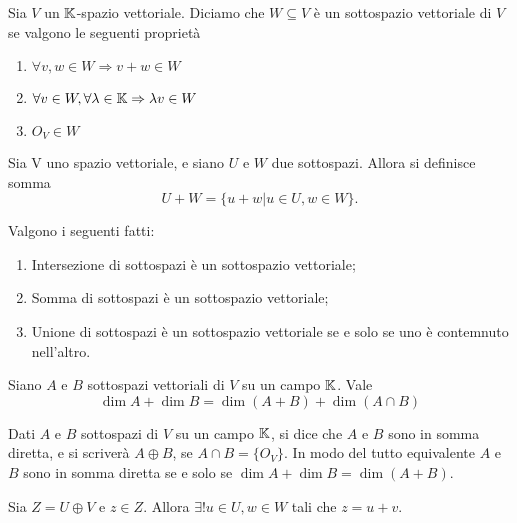 \begin{definition}
       Sia $ V $ un $ \mathbb{K} $-spazio vettoriale. Diciamo che $ W \subseteq V $ è un sottospazio vettoriale di $ V $ se valgono le seguenti proprietà
       \begin{enumerate}[label=(\roman*)]
               \item $ \forall v, w \in W \Rightarrow v + w \in W $
               \item $ \forall v \in W, \forall \lambda \in \mathbb{K} \Rightarrow \lambda v \in W $
               \item $ O_V \in W $
       \end{enumerate}
\end{definition}

\begin{definition}
	Sia V uno spazio vettoriale, e siano $U$ e $W$ due sottospazi. Allora si definisce somma
	\[ U+W = \{ u + w | u \in U, w \in W \}. \]

\begin{prop}
	Valgono i seguenti fatti: 
	\begin{enumerate}[label=(\roman*)]
		\item Intersezione di sottospazi è un sottospazio vettoriale;
		\item Somma di sottospazi è un sottospazio vettoriale;
		\item Unione di sottospazi è un sottospazio vettoriale se e solo se uno è contemnuto nell'altro.
	\end{enumerate}
\end{prop}


\begin{thm}
	Siano $ A $ e $ B $ sottospazi vettoriali di $ V $ su un campo $ \mathbb{K} $. Vale \[\dim{A} + \dim{B} = \dim{(A + B)} + \dim{(A \cap B)}\]
\end{thm}

\begin{definition}
	Dati $ A $ e $ B $ sottospazi di $ V $ su un campo $ \mathbb{K} $, si dice che $ A $ e $ B $ sono in somma diretta, e si scriverà $ A \oplus B$, se $ A \cap B = \{O_V\} $.
	In modo del tutto equivalente $ A $ e $ B $ sono in somma diretta se e solo se $ \dim{A} + \dim{B} =  \dim{(A + B)} $.	
\end{definition}

\begin{prop}
	Sia $ Z = U \oplus V $ e $ z \in Z$. Allora $ \exists! u \in U, w \in W$ tali che $ z = u + v $.
\end{prop}
	

\end{definition}

